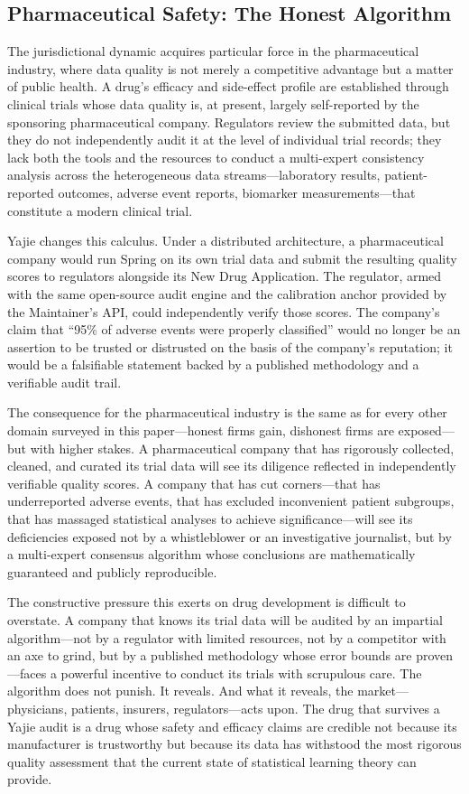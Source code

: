 \documentclass[12pt,a4paper]{ctexart}
\theoremstyle{definition}
\theoremstyle{remark}
\begin{document}
\subsection{Pharmaceutical Safety: The Honest Algorithm}

The jurisdictional dynamic acquires particular force in the pharmaceutical industry, where data quality is not merely a competitive advantage but a matter of public health. A drug's efficacy and side-effect profile are established through clinical trials whose data quality is, at present, largely self-reported by the sponsoring pharmaceutical company. Regulators review the submitted data, but they do not independently audit it at the level of individual trial records; they lack both the tools and the resources to conduct a multi-expert consistency analysis across the heterogeneous data streams—laboratory results, patient-reported outcomes, adverse event reports, biomarker measurements—that constitute a modern clinical trial.

Yajie changes this calculus. Under a distributed architecture, a pharmaceutical company would run Spring on its own trial data and submit the resulting quality scores to regulators alongside its New Drug Application. The regulator, armed with the same open-source audit engine and the calibration anchor provided by the Maintainer's API, could independently verify those scores. The company's claim that ``95\% of adverse events were properly classified'' would no longer be an assertion to be trusted or distrusted on the basis of the company's reputation; it would be a falsifiable statement backed by a published methodology and a verifiable audit trail.

The consequence for the pharmaceutical industry is the same as for every other domain surveyed in this paper—honest firms gain, dishonest firms are exposed—but with higher stakes. A pharmaceutical company that has rigorously collected, cleaned, and curated its trial data will see its diligence reflected in independently verifiable quality scores. A company that has cut corners—that has underreported adverse events, that has excluded inconvenient patient subgroups, that has massaged statistical analyses to achieve significance—will see its deficiencies exposed not by a whistleblower or an investigative journalist, but by a multi-expert consensus algorithm whose conclusions are mathematically guaranteed and publicly reproducible.

The constructive pressure this exerts on drug development is difficult to overstate. A company that knows its trial data will be audited by an impartial algorithm—not by a regulator with limited resources, not by a competitor with an axe to grind, but by a published methodology whose error bounds are proven—faces a powerful incentive to conduct its trials with scrupulous care. The algorithm does not punish. It reveals. And what it reveals, the market—physicians, patients, insurers, regulators—acts upon. The drug that survives a Yajie audit is a drug whose safety and efficacy claims are credible not because its manufacturer is trustworthy but because its data has withstood the most rigorous quality assessment that the current state of statistical learning theory can provide.
\end{document}
